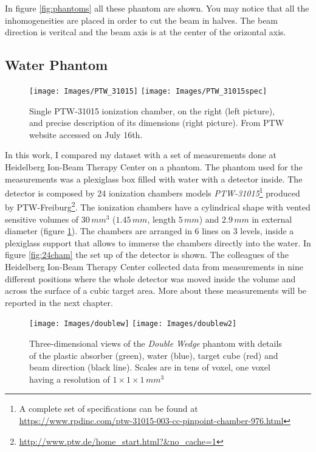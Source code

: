 \documentclass[12pt, a4paper, twoside]{book}
\begin{document}
In figure \ref{fig:phantoms} all these phantom are shown. You may notice that all the inhomogeneities are placed in order to cut the beam in halves. The beam direction is veritcal and the beam axis is at the center of the orizontal axis.


\subsection{Water Phantom}
\begin{figure}[h]
{\texttt{[image: Images/PTW\_31015]}}
{\texttt{[image: Images/PTW\_31015spec]}}
\caption{Single PTW-31015 ionization chamber, on the right (left picture), and precise description of its dimensions (right picture). From PTW website accessed on July 16th.}
\label{fig:31015}
\end{figure}
In this work, I compared my dataset with a set of measurements done at Heidelberg Ion-Beam Therapy Center on a phantom. The phantom used for the measurements was a plexiglass box filled with water with a detector inside. The detector is composed by 24 ionization chambers models \emph{PTW-31015}\footnote{A complete set of specifications can be found at \url{https://www.rpdinc.com/ptw-31015-003-cc-pinpoint-chamber-976.html}} produced by PTW-Freiburg\footnote{\url{http://www.ptw.de/home_start.html?&no_cache=1}}. The ionization chambers have a cylindrical shape with vented sensitive volumes of $30\,mm^3$ ($1.45\,mm$, length $5\,mm$) and $2.9\,mm$ in external diameter (figure \ref{fig:31015}).
The chambers are arranged in 6 lines on 3 levels, inside a plexiglass support that allows to immerse the chambers directly into the water. In figure \ref{fig:24cham} the set up of the detector is shown.
The colleagues of the Heidelberg Ion-Beam Therapy Center collected data from measurements in nine different positions where the whole detector was moved inside the volume and across the surface of a cubic target area. More about these measurements will be reported in the next chapter.

\begin{figure}[h]
{\texttt{[image: Images/doublew]}}
{\texttt{[image: Images/doublew2]}}
\caption{Three-dimensional views of the \emph{Double Wedge} phantom with details of the plastic absorber (green), water (blue), target cube (red) and beam direction (black line). Scales are in tens of voxel, one voxel having a resolution of $1\times1\times1\,mm^3$}
\label{fig:doublew}
\end{figure}
\end{document}
